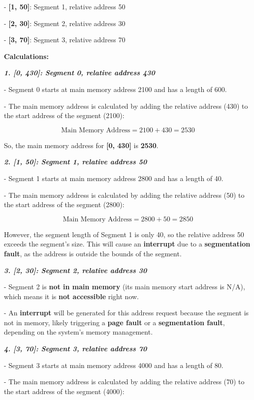 \documentclass[a4paper]{book}
\begin{document}
- \textbf{[1, 50]}: Segment 1, relative address 50

- \textbf{[2, 30]}: Segment 2, relative address 30

- \textbf{[3, 70]}: Segment 3, relative address 70

\textbf{Calculations:}

\textit{\textbf{1. \textbf{[0, 430]}: Segment 0, relative address 430}}

- Segment 0 starts at main memory address 2100 and has a length of 600.

- The main memory address is calculated by adding the relative address (430) to the start address of the segment (2100):
  
\[
\text{Main Memory Address} = 2100 + 430 = 2530
\]

So, the main memory address for \textbf{[0, 430]} is \textbf{2530}.

\textit{\textbf{2. \textbf{[1, 50]}: Segment 1, relative address 50}}

- Segment 1 starts at main memory address 2800 and has a length of 40.

- The main memory address is calculated by adding the relative address (50) to the start address of the segment (2800):
  
\[
\text{Main Memory Address} = 2800 + 50 = 2850
\]

However, the segment length of Segment 1 is only 40, so the relative address 50 exceeds the segment’s size. This will cause an \textbf{interrupt} due to a \textbf{segmentation fault}, as the address is outside the bounds of the segment.

\textit{\textbf{3. \textbf{[2, 30]}: Segment 2, relative address 30}}

- Segment 2 is \textbf{not in main memory} (its main memory start address is N/A), which means it is \textbf{not accessible} right now.

- An \textbf{interrupt} will be generated for this address request because the segment is not in memory, likely triggering a \textbf{page fault} or a \textbf{segmentation fault}, depending on the system's memory management.

\textit{\textbf{4. \textbf{[3, 70]}: Segment 3, relative address 70}}

- Segment 3 starts at main memory address 4000 and has a length of 80.

- The main memory address is calculated by adding the relative address (70) to the start address of the segment (4000):
  
\end{document}
